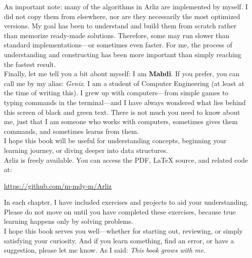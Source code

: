 An important note: many of the algorithms in Arliz are implemented by myself. I did not copy them from elsewhere, nor are they necessarily the most optimized versions. My goal has been to understand and build them from scratch rather than memorize ready-made solutions. Therefore, some may run slower than standard implementations—or sometimes even faster. For me, the process of understanding and constructing has been more important than simply reaching the fastest result.\\	
Finally, let me tell you a bit about myself:  
I am \textbf{Mahdi}. If you prefer, you can call me by my alias: \emph{Genix}. I am a student of Computer Engineering (at least at the time of writing this). I grew up with computers—from simple games to typing commands in the terminal—and I have always wondered what lies behind this screen of black and green text. There is not much you need to know about me, just that I am someone who works with computers, sometimes gives them commands, and sometimes learns from them.\\	
I hope this book will be useful for understanding concepts, beginning your learning journey, or diving deeper into data structures. \\	
Arliz is freely available. You can access the PDF, LaTeX source, and related code at:  
\begin{center}
	\url{https://github.com/m-mdy-m/Arliz}
\end{center}
In each chapter, I have included exercises and projects to aid your understanding. Please do not move on until you have completed these exercises, because true learning happens only by solving problems.\\	
I hope this book serves you well—whether for starting out, reviewing, or simply satisfying your curiosity. And if you learn something, find an error, or have a suggestion, please let me know. As I said:
\emph{This book grows with me.}